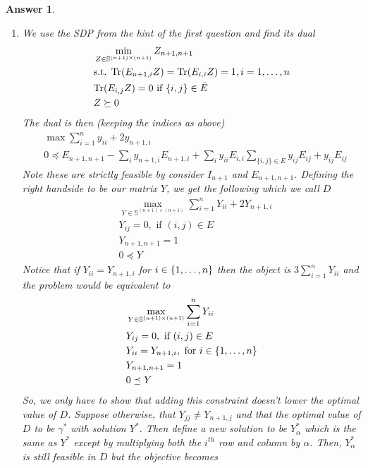 \documentclass[12pt]{article}
\theoremstyle{colon}
\newtheorem*{answer}{Answer}
\begin{document}
\clearpage

\begin{answer}
  \begin{enumerate}[label=\arabic*)]
    \item We use the SDP from the hint of the first question and find its dual
      \begin{align*}
        &\min_{Z \in \mathbb{S}^{(n+1) \times (n+1)}} Z_{n+1, n+1} \\
        &\text{s.t. } \text{Tr}(E_{n+1,i} Z) = \text{Tr}(E_{i,i} Z) = 1, i = 1, \mathellipsis, n \\
        &\text{Tr}(E_{i,j} Z) = 0 \text{ if } \{i,j\} \in \bar{E} \\
        &Z \succeq 0
      \end{align*}
      The dual is then (keeping the indices as above)
      \begin{align*}
        &\max \sum_{i=1}^n y_{ii} + 2y_{n+1,i} \\
        &0 \preceq E_{n+1, n+1} -\sum_i y_{n+1, i} E_{n+1, i} + \sum_i y_{ii} E_{i, i} \sum_{\{i,j\} \in \bar{E}} y_{ij} E_{ij} + y_{ij} E_{ij}
      \end{align*}
      Note these are strictly feasible by consider $I_{n+1}$ and $E_{n+1, n+1}$. Defining the right handside to be our matrix $Y$, we get the following which we call $D$
      \begin{align*}
        &\max_{Y \in \mathbb{S}^{(n+1) \times (n+1)}} \sum_{i=1}^n Y_{ii} + 2Y_{n+1,i} \\
        &Y_{ij} = 0, \text{ if } (i,j) \in E \\
        &Y_{n+1, n+1} = 1 \\
        &0 \preceq Y
      \end{align*}
      Notice that if $Y_{ii} = Y_{n+1,i}$ for $i \in \{1, \mathellipsis, n\}$ then the object is $3 \sum_{i=1}^n Y_{ii}$ and the problem would be equivalent to
      \begin{align*}
        &\max_{Y \in \mathbb{S}^{(n+1) \times (n+1)}} \sum_{i=1}^n Y_{ii} \\
        &Y_{ij} = 0, \text{ if } (i,j) \in E \\
        &Y_{ii} = Y_{n+1,i}, \text{ for } i \in \{1, \mathellipsis, n\} \\
        &Y_{n+1, n+1} = 1 \\
        &0 \preceq Y
      \end{align*}
      So, we only have to show that adding this constraint doesn't lower the optimal value of $D$. Suppose otherwise, that $Y_{jj} \neq Y_{n+1,j}$ and that the optimal value of $D$ to be $\gamma^*$ with solution $Y^*$. Then define a new solution to be $Y_\alpha^*$ which is the same as $Y^*$ except by multiplying both the $i^{th}$ row and column by $\alpha$. Then, $Y_\alpha^*$ is still feasible in $D$ but the objective becomes

\end{enumerate}
\end{answer}
\end{document}
